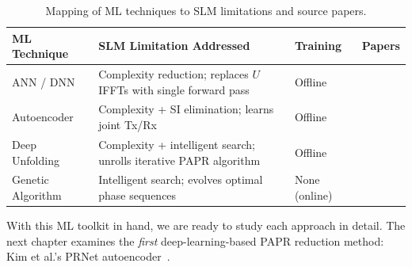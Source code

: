 \begin{table}[htbp]
    \centering
    \caption{Mapping of ML techniques to SLM limitations and source papers.}
    \label{tab:ml_tools_mapping}
    \begin{tabularx}{\textwidth}{@{} >{\raggedright\arraybackslash}p{2.5cm} >{\raggedright\arraybackslash}X >{\raggedright\arraybackslash}p{2cm} >{\raggedright\arraybackslash}p{2.5cm} @{}}
        \toprule
        \textbf{ML Technique} & \textbf{SLM Limitation Addressed} & \textbf{Training} & \textbf{Papers} \\
        \midrule
        ANN / DNN &
            Complexity reduction; replaces $U$ IFFTs with single forward pass &
            Offline &
            \cite{da2024survey,zou2021novel} \\[6pt]
        Autoencoder &
            Complexity + SI elimination; learns joint Tx/Rx &
            Offline &
            \cite{kim2017novel,hao2019extended,alnaseri2025deep} \\[6pt]
        Deep Unfolding &
            Complexity + intelligent search; unrolls iterative PAPR algorithm &
            Offline &
            \cite{nguyen2022deep} \\[6pt]
        Genetic Algorithm &
            Intelligent search; evolves optimal phase sequences &
            None (online) &
            \cite{ali2016new} \\
        \bottomrule
    \end{tabularx}
\end{table}

With this ML toolkit in hand, we are ready to study each approach in
detail.  The next chapter examines the \emph{first} deep-learning-based
PAPR reduction method: Kim et al.'s PRNet autoencoder~\cite{kim2017novel}.
